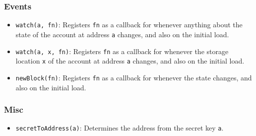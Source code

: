 \documentclass[9pt,oneside]{amsart}
\begin{document}
\subsubsection{Events}

\begin{itemize}
\item \texttt{watch(a, fn)}: Registers \texttt{fn} as a callback for whenever anything about the state of the account at address \texttt{a} changes, and also on the initial load.
\item \texttt{watch(a, x, fn)}: Registers \texttt{fn} as a callback for whenever the storage location \texttt{x} of the account at address \texttt{a} changes, and also on the initial load.
\item \texttt{newBlock(fn)}: Registers \texttt{fn} as a callback for whenever the state changes, and also on the initial load.
\end{itemize}

\subsubsection{Misc}

\begin{itemize}
\item \texttt{secretToAddress(a)}: Determines the address from the secret key \texttt{a}.
\end{itemize}
\end{document}
